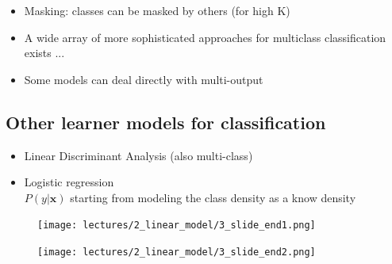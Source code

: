 \documentclass[../main.tex]{subfiles}
\begin{document}
\begin{itemize}
    \item Masking: classes can be masked by others (for high K) 
    \item A wide array of more sophisticated approaches for
multiclass classification exists ...
    \item Some models can deal directly with multi-output
\end{itemize}

\subsection{Other learner models for classification}
\begin{itemize}
    \item Linear Discriminant Analysis (also multi-class)
    \item Logistic regression\\
    $P(y | \mathbf{x})$  starting from modeling the class density as a know density
\end{itemize}

\begin{figure}[H]
    \centering
    \texttt{[image: lectures/2\_linear\_model/3\_slide\_end1.png]}
\end{figure}
\begin{figure}[H]
    \centering
    \texttt{[image: lectures/2\_linear\_model/3\_slide\_end2.png]}
\end{figure}
\end{document}
